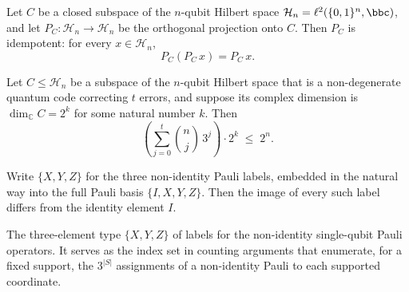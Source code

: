 \begin{lemma}
\label{codeProj_idempotent}
\leanok
{}
Let $C$ be a closed subspace of the $n$-qubit Hilbert space $\mathcal{H}_n =
\ell^2(\{0,1\}^n, \bbc)$, and let $P_C : \mathcal{H}_n \to \mathcal{H}_n$ be the
orthogonal projection onto $C$. Then $P_C$ is idempotent: for every $x \in
\mathcal{H}_n$, \[ P_C(P_C\, x) = P_C\, x. \]
\end{lemma}

\begin{theorem}
\label{quantum_hamming_bound_raw}
\leanok
{}
Let $C \le \mathcal{H}_n$ be a subspace of the $n$-qubit Hilbert space that is a
non-degenerate quantum code correcting $t$ errors, and suppose its complex dimension is
$\dim_{\mathbb{C}} C = 2^{k}$ for some natural number $k$. Then
\[
\left(\sum_{j=0}^{t}\binom{n}{j}\,3^{j}\right)\cdot 2^{k} \;\le\; 2^{n}.
\]
\end{theorem}

\begin{lemma}
\label{PauliNZ.toBasis_ne_I}
\leanok
{}
Write $\{X, Y, Z\}$ for the three non-identity Pauli labels, embedded in the natural way
into the full Pauli basis $\{I, X, Y, Z\}$. Then the image of every such label differs
from the identity element $I$.
\end{lemma}

\begin{definition}
\label{PauliNZ}
\leanok
The three-element type $\{X, Y, Z\}$ of labels for the non-identity single-qubit Pauli
operators. It serves as the index set in counting arguments that enumerate, for a fixed
support, the $3^{|S|}$ assignments of a non-identity Pauli to each supported coordinate.
\end{definition}
